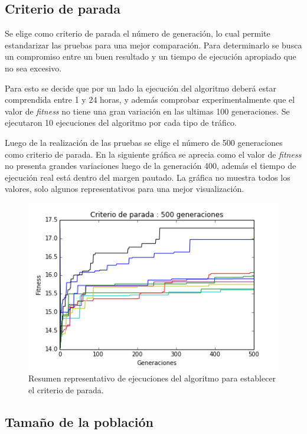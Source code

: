 \subsection{Criterio de parada}
Se elige como criterio de parada el número de generación, lo cual permite estandarizar las pruebas para una mejor comparación. Para determinarlo se busca un compromiso entre un buen resultado y un tiempo de ejecución apropiado que no sea excesivo.

Para esto se decide que por un lado la ejecución del algoritmo deberá estar comprendida entre 1 y 24 horas, y además comprobar experimentalmente que el valor de \emph{fitness} no tiene una gran variación en las ultimas 100 generaciones. Se ejecutaron 10 ejecuciones del algoritmo por cada tipo de tráfico.

Luego de la realización de las pruebas se elige el número de 500 generaciones como criterio de parada.
En la siguiente gráfica se aprecia como el valor de \emph{fitness} no presenta grandes variaciones luego de la generación 400, además el tiempo de ejecución real está dentro del margen pautado. La gráfica no muestra todos los valores, solo algunos representativos para una mejor visualización.



\begin{figure}[h]
\centering
\includegraphics[width=0.8\linewidth]{Figures/criterio_parada}
\caption{Resumen representativo de ejecuciones del algoritmo para establecer el criterio de parada.}
\label{fig:criterio_parada}
\end{figure}



\subsection{Tamaño de la población}

